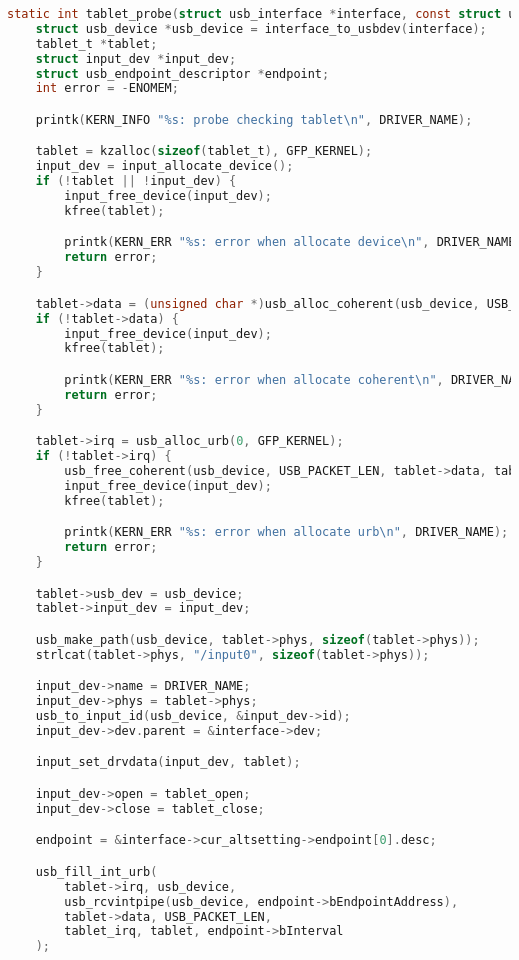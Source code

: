\begin{lstlisting}[language=c,caption=Функция подключения планшета,label=lst:probe]
static int tablet_probe(struct usb_interface *interface, const struct usb_device_id *id) {
    struct usb_device *usb_device = interface_to_usbdev(interface);
    tablet_t *tablet;
    struct input_dev *input_dev;
    struct usb_endpoint_descriptor *endpoint;
    int error = -ENOMEM;

    printk(KERN_INFO "%s: probe checking tablet\n", DRIVER_NAME);

    tablet = kzalloc(sizeof(tablet_t), GFP_KERNEL);
    input_dev = input_allocate_device();
    if (!tablet || !input_dev) {
        input_free_device(input_dev);
        kfree(tablet);

        printk(KERN_ERR "%s: error when allocate device\n", DRIVER_NAME);
        return error;
    }

    tablet->data = (unsigned char *)usb_alloc_coherent(usb_device, USB_PACKET_LEN, GFP_KERNEL, &tablet->data_dma);
    if (!tablet->data) {
        input_free_device(input_dev);
        kfree(tablet);

        printk(KERN_ERR "%s: error when allocate coherent\n", DRIVER_NAME);
        return error;
    }

    tablet->irq = usb_alloc_urb(0, GFP_KERNEL);
    if (!tablet->irq) {
        usb_free_coherent(usb_device, USB_PACKET_LEN, tablet->data, tablet->data_dma);
        input_free_device(input_dev);
        kfree(tablet);

        printk(KERN_ERR "%s: error when allocate urb\n", DRIVER_NAME);
        return error;
    }

    tablet->usb_dev = usb_device;
    tablet->input_dev = input_dev;

    usb_make_path(usb_device, tablet->phys, sizeof(tablet->phys));
    strlcat(tablet->phys, "/input0", sizeof(tablet->phys));

    input_dev->name = DRIVER_NAME;
    input_dev->phys = tablet->phys;
    usb_to_input_id(usb_device, &input_dev->id);
    input_dev->dev.parent = &interface->dev;

    input_set_drvdata(input_dev, tablet);

    input_dev->open = tablet_open;
    input_dev->close = tablet_close;

    endpoint = &interface->cur_altsetting->endpoint[0].desc;

    usb_fill_int_urb(
        tablet->irq, usb_device,
        usb_rcvintpipe(usb_device, endpoint->bEndpointAddress),
        tablet->data, USB_PACKET_LEN,
        tablet_irq, tablet, endpoint->bInterval
    );


\end{lstlisting}
